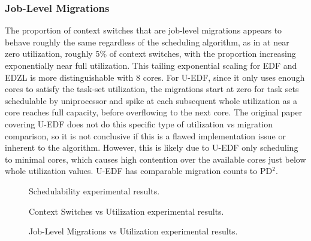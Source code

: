 \documentclass[conference,compsoc]{IEEEtran}
\begin{document}
\subsubsection{Job-Level Migrations} The proportion of context switches that are job-level migrations appears to behave roughly the same regardless of the scheduling algorithm, as in at near zero utilization, roughly 5\% of context switches, with the proportion increasing exponentially near full utilization. This tailing exponential scaling for EDF and EDZL is more distinguishable with 8 cores. For U-EDF, since it only uses enough cores to satisfy the task-set utilization, the migrations start at zero for task sets schedulable by uniprocessor and spike at each subsequent whole utilization as a core reaches full capacity, before overflowing to the next core. The original paper covering U-EDF \cite{uedf} does not do this specific type of utilization vs migration comparison, so it is not conclusive if this is a flawed implementation issue or inherent to the algorithm. However, this is likely due to U-EDF only scheduling to minimal cores, which causes high contention over the available cores just below whole utilization values. U-EDF has comparable migration counts to PD$^2$.

\begin{figure}
\scalebox{.95}{

}\hspace{1px}
\scalebox{.95}{

}\hspace{1px}
\scalebox{.95}{

}
\caption{Schedulability experimental results.}
\label{fig_sched}
\end{figure}

\begin{figure}
\scalebox{.95}{

}\hspace{1px}
\scalebox{.95}{

}\hspace{1px}
\scalebox{.95}{

}
\caption{Context Switches vs Utilization experimental results.}
\label{fig_cswitch}
\end{figure}

\begin{figure}
\scalebox{.95}{

}\hspace{1px}
\scalebox{.95}{

}\hspace{1px}
\scalebox{.95}{

}
\caption{Job-Level Migrations vs Utilization experimental results.}
\label{fig_mig}
\end{figure}
\end{document}
